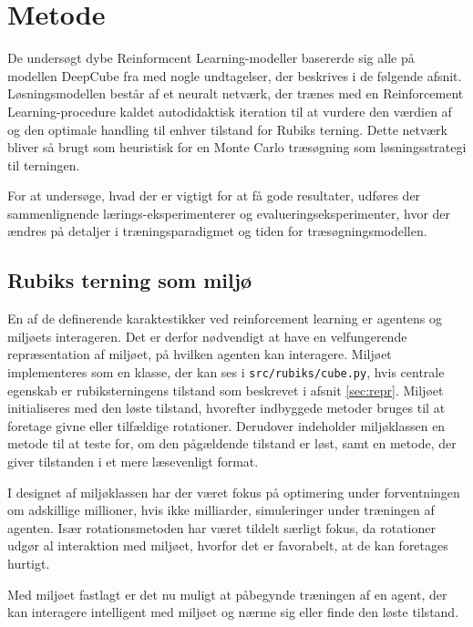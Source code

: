 \documentclass[../main.tex]{subfiles}
\begin{document}
\chapter{Metode}
De undersøgt dybe Reinformcent Learning-modeller basererde sig alle på modellen DeepCube fra \cite{HumansBeGone} med nogle undtagelser, der beskrives i de følgende afsnit.
Løsningsmodellen består af et neuralt netværk, der trænes med en Reinforcement Learning-procedure kaldet autodidaktisk iteration til at vurdere den værdien af og den optimale handling til enhver tilstand for Rubiks terning.
Dette netværk bliver så brugt som heuristisk for en Monte Carlo træsøgning som løsningsstrategi til terningen.

For at undersøge, hvad der er vigtigt for at få gode resultater, udføres der sammenlignende lærings-eksperimenterer og evalueringseksperimenter, hvor der ændres på detaljer i træningsparadigmet og tiden for træsøgningsmodellen. 

\section{Rubiks terning som miljø}\label{sec:environment}
En af de definerende karaktestikker ved reinforcement learning er agentens og miljøets interageren.
Det er derfor nødvendigt at have en velfungerende repræsentation af miljøet, på hvilken agenten kan interagere.
Miljøet implementeres som en klasse, der kan ses i \texttt{src/rubiks/cube.py}, hvis centrale egenskab er rubiksterningens tilstand som beskrevet i afsnit \ref{sec:repr}.
Miljøet initialiseres med den løste tilstand, hvorefter indbyggede metoder bruges til at foretage givne eller tilfældige rotationer.
Derudover indeholder miljøklassen en metode til at teste for, om den pågældende tilstand er løst, samt en metode, der giver tilstanden i et mere læsevenligt format.

I designet af miljøklassen har der været fokus på optimering under forventningen om adskillige millioner, hvis ikke milliarder, simuleringer under træningen af agenten.
Især rotationsmetoden har været tildelt særligt fokus, da rotationer udgør al interaktion med miljøet, hvorfor det er favorabelt, at de kan foretages hurtigt.

Med miljøet fastlagt er det nu muligt at påbegynde træningen af en agent, der kan interagere intelligent med miljøet og nærme sig eller finde den løste tilstand.
\end{document}
